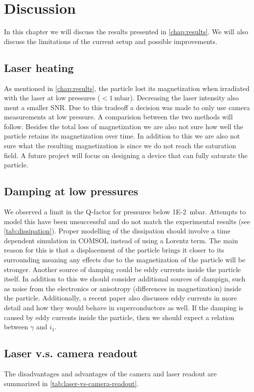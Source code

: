 \chapter{Discussion}
\label{chap:discussion}
In this chapter we will discuss the results presented in \autoref{chap:results}. We will also discuss the limitations of the current setup and possible improvements.

\section*{Laser heating}
As mentioned in \autoref{chap:results}, the particle lost its magnetization when irradiated with the laser at low pressures ($<\qty{1}{\milli\bar}$). Decreasing the laser intensity also ment a smaller SNR. Due to this tradeoff a decision was made to only use camera measurements at low pressure. A comparision between the two methods will follow. Besides the total loss of magnetization we are also not sure how well the particle retains its magnetization over time. In addition to this we are also not sure what the resulting magnetization is since we do not reach the saturation field. A future project will focus on designing a device that can fully saturate the particle.

\section*{Damping at low pressures}
We observed a limit in the Q-factor for pressures below \qty{1E-2}{\milli\bar}. Attempts to model this have been unsuccessful and do not match the experimental results (see \autoref{tab:dissipation}). Proper modelling of the dissipation should involve a time dependent simulation in COMSOL instead of using a Lorentz term. The main reason for this is that a displacement of the particle brings it closer to its surrounding meaning any effects due to the magnetization of the particle will be stronger. Another source of damping could be eddy currents inside the particle itself. In addition to this we should consider additional sources of dampign, such as noise from the electronics or anisotropy (differences in magnetization) inside the particle\cite{millen}. Additionally, a recent paper also discusses eddy currents in more detail and how they would behave in superconductors as well\cite{fuwa_stable_2023}. If the damping is caused by eddy currents inside the particle, then we should expect a relation between $\gamma$ and $i_1$.

\section*{Laser v.s. camera readout}
The disadvantages and advantages of the camera and laser readout are summarized in \autoref{tab:laser-vs-camera-readout}.

